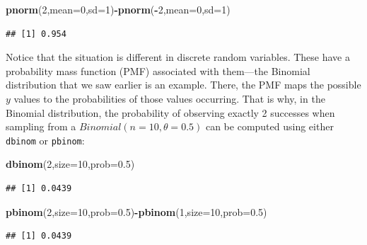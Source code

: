 \documentclass[12pt,]{krantz}
\newenvironment{Shaded}{\begin{snugshade}}{\end{snugshade}}
\newcommand{\DataTypeTok}[1]{\textcolor[rgb]{0.13,0.29,0.53}{#1}}
\newcommand{\DecValTok}[1]{\textcolor[rgb]{0.00,0.00,0.81}{#1}}
\newcommand{\FloatTok}[1]{\textcolor[rgb]{0.00,0.00,0.81}{#1}}
\newcommand{\KeywordTok}[1]{\textcolor[rgb]{0.13,0.29,0.53}{\textbf{#1}}}
\newcommand{\NormalTok}[1]{#1}
\newcommand{\OperatorTok}[1]{\textcolor[rgb]{0.81,0.36,0.00}{\textbf{#1}}}
\theoremstyle{definition}
\theoremstyle{definition}
\theoremstyle{definition}
\theoremstyle{remark}
\begin{document}
\begin{Shaded}
\begin{Highlighting}[]
\KeywordTok{pnorm}\NormalTok{(}\DecValTok{2}\NormalTok{,}\DataTypeTok{mean=}\DecValTok{0}\NormalTok{,}\DataTypeTok{sd=}\DecValTok{1}\NormalTok{)}\OperatorTok{-}\KeywordTok{pnorm}\NormalTok{(}\OperatorTok{-}\DecValTok{2}\NormalTok{,}\DataTypeTok{mean=}\DecValTok{0}\NormalTok{,}\DataTypeTok{sd=}\DecValTok{1}\NormalTok{)}
\end{Highlighting}
\end{Shaded}

\begin{verbatim}
## [1] 0.954
\end{verbatim}

Notice that the situation is different in discrete random variables. These have a probability mass function (PMF) associated with them---the Binomial distribution that we saw earlier is an example. There, the PMF maps the possible \(y\) values to the probabilities of those values occurring. That is why, in the Binomial distribution, the probability of observing exactly 2 successes when sampling from a \(Binomial(n=10,\theta=0.5)\) can be computed using either \texttt{dbinom} or \texttt{pbinom}:

\begin{Shaded}
\begin{Highlighting}[]
\KeywordTok{dbinom}\NormalTok{(}\DecValTok{2}\NormalTok{,}\DataTypeTok{size=}\DecValTok{10}\NormalTok{,}\DataTypeTok{prob=}\FloatTok{0.5}\NormalTok{)}
\end{Highlighting}
\end{Shaded}

\begin{verbatim}
## [1] 0.0439
\end{verbatim}

\begin{Shaded}
\begin{Highlighting}[]
\KeywordTok{pbinom}\NormalTok{(}\DecValTok{2}\NormalTok{,}\DataTypeTok{size=}\DecValTok{10}\NormalTok{,}\DataTypeTok{prob=}\FloatTok{0.5}\NormalTok{)}\OperatorTok{-}\KeywordTok{pbinom}\NormalTok{(}\DecValTok{1}\NormalTok{,}\DataTypeTok{size=}\DecValTok{10}\NormalTok{,}\DataTypeTok{prob=}\FloatTok{0.5}\NormalTok{)}
\end{Highlighting}
\end{Shaded}

\begin{verbatim}
## [1] 0.0439
\end{verbatim}
\end{document}
